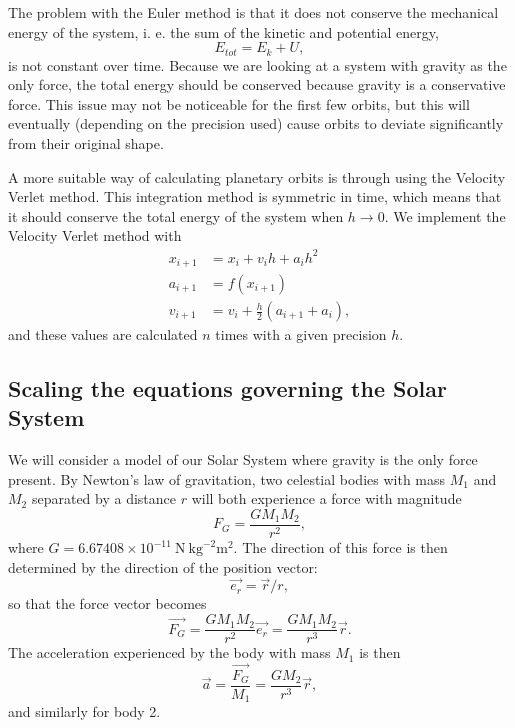 \documentclass{emulateapj}
\begin{document}
The problem with the Euler method is that it does not conserve the mechanical energy of the system, i. e. the sum of the kinetic and potential energy,
%
\begin{equation}
E_{tot} = E_k + U,
\end{equation}
%
is not constant over time. Because we are looking at a system with gravity as the only force, the total energy should be conserved because gravity is a conservative force. This issue may not be noticeable for the first few orbits, but this will eventually (depending on the precision used) cause orbits to deviate significantly from their original shape.

A more suitable way of calculating planetary orbits is through using the Velocity Verlet method. This integration method is symmetric in time, which means that it should conserve the total energy of the system when $h \rightarrow 0$. We implement the Velocity Verlet method with
%
\begin{align*}
    x_{i + 1} & = x_i + v_i h + a_i h^2 \\
    a_{i + 1} & = f(x_{i+1}) \\
    v_{i + 1} & = v_i + \frac{h}{2}\left(a_{i+1} + a_i\right),
\end{align*}
%
and these values are calculated $n$ times with a given precision $h$.

\subsection{Scaling the equations governing the Solar System}
We will consider a model of our Solar System where gravity is the only force present. By Newton's law of gravitation, two celestial bodies with mass $M_1$ and $M_2$ separated by a distance $r$ will both experience a force with magnitude
%
\begin{equation}\label{eq:gforce}
    F_G = \frac{G M_1 M_2}{r^2},
\end{equation}
where $G = 6.67408 \times 10^{-11} \ \textrm{N} \ \textrm{kg}^{-2} \textrm{m}^2$. The direction of this force is then determined by the direction of the position vector:
%
\begin{equation*}
    \Vec{e_r} = \Vec{r}/ r ,
\end{equation*}
%
so that the force vector becomes
%
\begin{equation}
    \Vec{F_G} = \frac{G M_1 M_2}{r^2}\Vec{e_r} = \frac{G M_1 M_2}{r^3}\Vec{r}.
\end{equation}
%
The acceleration experienced by the body with mass $M_1$ is then
%
\begin{equation}\label{eq:accel}
    \Vec{a} = \frac{\vec{F_G}}{M_1} = \frac{G M_2}{r^3}\Vec{r},
\end{equation}
%
and similarly for body 2.
\end{document}
